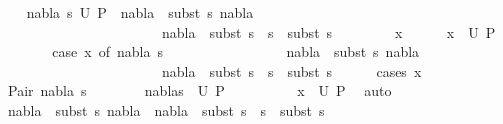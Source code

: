 \begin{isabellebody}
\ \ \isamarkupfalse%
\ {\isachardoublequoteopen}{\isasymforall}{\isacharparenleft}{\kern0pt}nabla{}{\isacharcomma}{\kern0pt}\ s{}{\isacharparenright}{\kern0pt}{\isasymin}\ U\ P{\isachardot}{\kern0pt}\ \ nabla{}\ {\isasymTurnstile}\ {\isacharparenleft}{\kern0pt}subst\ s{}{\isacharparenright}{\kern0pt}\ nabla\ {\isasymand}\ \ \isanewline
\ \ \ \ \ \ \ \ \ \ \ \ \ \ \ \ \ \ \ \ \ \ \ nabla{}\ {\isasymTurnstile}\ subst\ {\isacharparenleft}{\kern0pt}s{}\ {\isasymbullet}\ s{\isacharparenright}{\kern0pt}\ {\isasymapprox}\ subst\ s{}{\isachardoublequoteclose}\isanewline
\ \ \isamarkupfalse%
\isanewline
\ \ \ \ \isamarkupfalse%
\ x\isanewline
\ \ \ \ \isamarkupfalse%
\ {\isachardoublequoteopen}x\ {\isasymin}\ U\ P{\isachardoublequoteclose}\isanewline
\ \ \ \ \isamarkupfalse%
\ \isamarkupfalse%
\ {\isachardoublequoteopen}case\ x\ of\ {\isacharparenleft}{\kern0pt}nabla{}{\isacharcomma}{\kern0pt}\ s{}{\isacharparenright}{\kern0pt}\ {\isasymRightarrow}\ \isanewline
\ \ \ \ \ \ \ \ \ \ \ \ \ \ \ nabla{}\ {\isasymTurnstile}\ {\isacharparenleft}{\kern0pt}subst\ s{}{\isacharparenright}{\kern0pt}\ nabla\ {\isasymand}\ \ \isanewline
\ \ \ \ \ \ \ \ \ \ \ \ \ \ \ \ \ \ \ \ \ \ \ nabla{}\ {\isasymTurnstile}\ subst\ {\isacharparenleft}{\kern0pt}s{}\ {\isasymbullet}\ s{\isacharparenright}{\kern0pt}\ {\isasymapprox}\ subst\ s{}{\isachardoublequoteclose}\isanewline
\ \ \ \ \isamarkupfalse%
\ {\isacharparenleft}{\kern0pt}cases\ x{\isacharparenright}{\kern0pt}\isanewline
\ \ \ \ \ \ \isamarkupfalse%
\ {\isacharparenleft}{\kern0pt}Pair\ nabla{}\ s{}{\isacharparenright}{\kern0pt}\isanewline
\ \ \ \ \ \ \isamarkupfalse%
\ {\isachardoublequoteopen}{\isacharparenleft}{\kern0pt}nabla{}{\isacharcomma}{\kern0pt}s{}{\isacharparenright}{\kern0pt}\ {\isasymin}\ U\ P{\isachardoublequoteclose}\isanewline
\ \ \ \ \ \ \ \ \isamarkupfalse%
\ {\isacartoucheopen}x\ {\isasymin}\ U\ P{\isacartoucheclose}\ \isamarkupfalse%
\ auto\isanewline
\ \ \ \ \ \ \isamarkupfalse%
\ {\isachardoublequoteopen}nabla{}\ {\isasymTurnstile}\ {\isacharparenleft}{\kern0pt}subst\ s{}{\isacharparenright}{\kern0pt}\ nabla\ {\isasymand}\ nabla{}\ {\isasymTurnstile}\ subst\ {\isacharparenleft}{\kern0pt}s{}\ {\isasymbullet}\ s{\isacharparenright}{\kern0pt}\ {\isasymapprox}\ subst\ s{}{\isachardoublequoteclose}\isanewline

\end{isabellebody}
